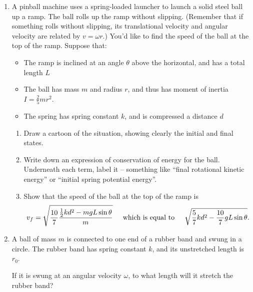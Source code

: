 \documentclass[12pt]{article}
\newcommand{\BI}{\begin{itemize}}
\newcommand{\EI}{\end{itemize}}
\begin{document}
\begin{enumerate}
\item A pinball machine uses a spring-loaded launcher to launch a solid steel ball up a ramp. The ball rolls up the ramp without slipping. (Remember that if something rolls without slipping, its translational
velocity and angular velocity are related by $v=\omega r$.) You'd like to find the speed of the ball at the top of the ramp. Suppose that:

\BI
\item The ramp is inclined at an angle $\theta$ above the horizontal, and has a total length $L$
\item The ball has mass $m$ and radius $r$, and thus has moment of inertia $I=\frac{2}{5}mr^2$.
\item The spring has spring constant $k$, and is compressed a distance $d$
\EI

\begin{enumerate}

\item Draw a cartoon of the situation, showing clearly the initial and final states.

\vspace{3in}

\item Write down an expression of conservation of energy for the ball. Underneath each term, label it -- something like ``final rotational kinetic energy'' or ``initial spring potential energy''.

\vspace{3in}
\newpage
\item Show that the speed of the ball at the top of the ramp is $$v_f = \sqrt {\frac{10}{7} \frac {\frac{1}{2}kd^2 - mgL \sin \theta}{m}}\hspace{0.2in}\text{which is equal to}\hspace{0.2in} \sqrt{\frac{5}{7} kd^2 - \frac{10}{7}gL \sin \theta}.$$
\vspace{4in}
\end{enumerate}

\item A ball of mass $m$ is connected to one end of a rubber band and swung in a circle. The rubber band has spring constant $k$, and
its unstretched length is $r_0$.

If it is swung at an angular velocity $\omega$, to what length will it stretch the rubber band?



\end{enumerate}
\end{document}
